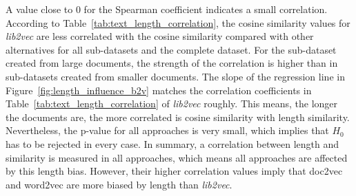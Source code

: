 \documentclass[11pt]{article}
\begin{document}
A value close to $0$ for the Spearman coefficient indicates a small correlation.
According to Table~\ref{tab:text_length_correlation}, the cosine similarity values for \emph{lib2vec} are less correlated with the cosine similarity compared with other alternatives for all sub-datasets and the complete dataset.
For the sub-dataset created from large documents, the strength of the correlation is higher than in sub-datasets created from smaller documents.
The slope of the regression line in Figure~\ref{fig:length_influence_b2v} matches the correlation coefficients in Table~\ref{tab:text_length_correlation} of \emph{lib2vec} roughly.
This means, the longer the documents are, the more correlated is cosine similarity with length similarity.
Nevertheless, the p-value for all approaches is very small, which implies that $H_0$ has to be rejected in every case.
In summary, a correlation between length and similarity is measured in all approaches, which means all approaches are affected by this length bias.
However, their higher correlation values imply that doc2vec and word2vec are more biased by length than \emph{lib2vec}.
\end{document}
